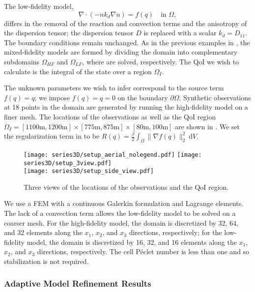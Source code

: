 The low-fidelity model,
%
\begin{equation}
\nabla\cdot(- nk_d\nabla u) = f(q) \quad \text{in } \Omega, \label{eq:LFeq3D}
\end{equation}
%
differs in the removal of the reaction and convection terms and the anisotropy of the dispersion tensor; the dispersion tensor $D$ is replaced with a scalar $k_d=D_{11}$. The boundary conditions remain unchanged. As in the previous examples in , the mixed-fidelity models are formed by dividing the domain into complementary subdomains $\Omega_{HF}$ and $\Omega_{LF}$, where  are solved, respectively. The QoI we wish to calculate is the integral of the state over a region $\Omega_I$.

The unknown parameters we wish to infer correspond to the source term $f(q)=q$; we impose $f(q)=q=0$ on the boundary $\partial\Omega$. Synthetic observations at 18 points in the domain are generated by running the high-fidelity model on a finer mesh. The locations of the observations as well as the QoI region $\Omega_I=[1100\textrm{m},1200\textrm{m}]\times[775\textrm{m},875\textrm{m}]\times[80\textrm{m},100\textrm{m}]$ are shown in . We set the regularization term in  to be $R(q)=\frac{\beta}{2}\int_\Omega \|\nabla f(q)\|_2^2\:\textrm{d}V$.
%
\begin{figure}[htbp]
\centering
\texttt{[image: series3D/setup\_aerial\_nolegend.pdf]} \hfill
\texttt{[image: series3D/setup\_3view.pdf]} \\
\vspace{\baselineskip}
\texttt{[image: series3D/setup\_side\_view.pdf]}
\caption{Three views of the locations of the observations and the QoI region.}
\label{fig:setup3D}
\end{figure}
%

We use a FEM with a continuous Galerkin formulation and Lagrange elements. The lack of a convection term allows the low-fidelity model to be solved on a coarser mesh. For the high-fidelity model, the domain is discretized by 32, 64, and 32 elements along the $x_1$, $x_2$, and $x_3$ directions, respectively; for the low-fidelity model, the domain is discretized by 16, 32, and 16 elements along the $x_1$, $x_2$, and $x_3$ directions, respectively. The cell P\'{e}clet number is less than one and so stabilization is not required.

\subsubsection{Adaptive Model Refinement Results} \label{sec:ref3D_diffmesh}

